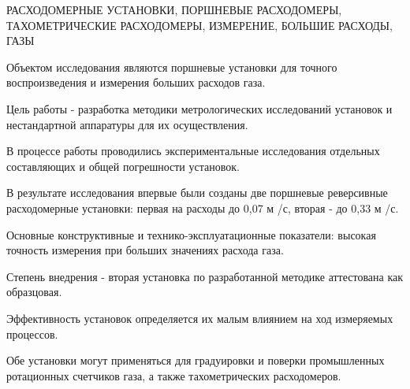 \mainText
РАСХОДОМЕРНЫЕ УСТАНОВКИ, ПОРШНЕВЫЕ РАСХОДОМЕРЫ, ТАХОМЕТРИЧЕСКИЕ РАСХОДОМЕРЫ, ИЗМЕРЕНИЕ, БОЛЬШИЕ РАСХОДЫ, ГАЗЫ

Объектом исследования являются поршневые установки для точного воспроизведения и измерения больших расходов газа.

Цель работы - разработка методики метрологических исследований установок и нестандартной аппаратуры для их осуществления.

В процессе работы проводились экспериментальные исследования отдельных составляющих и общей погрешности установок.

В результате исследования впервые были созданы две поршневые реверсивные расходомерные установки: первая на расходы до 0,07 м /с, вторая - до 0,33 м /с.

Основные конструктивные и технико-эксплуатационные показатели: высокая точность измерения при больших значениях расхода газа.

Степень внедрения - вторая установка по разработанной методике аттестована как образцовая.

Эффективность установок определяется их малым влиянием на ход измеряемых процессов.

Обе установки могут применяться для градуировки и поверки промышленных ротационных счетчиков газа, а также тахометрических расходомеров.
